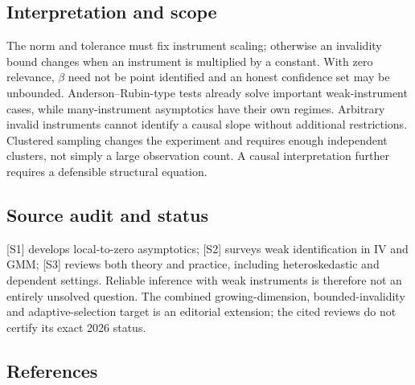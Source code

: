 \documentclass[11pt,a4paper]{article}
\begin{document}
\subsection*{Interpretation and scope}

The norm and tolerance must fix instrument scaling; otherwise an invalidity bound changes when an instrument is multiplied by a constant. With zero relevance, $\beta$ need not be point identified and an honest confidence set may be unbounded. Anderson--Rubin-type tests already solve important weak-instrument cases, while many-instrument asymptotics have their own regimes. Arbitrary invalid instruments cannot identify a causal slope without additional restrictions. Clustered sampling changes the experiment and requires enough independent clusters, not simply a large observation count. A causal interpretation further requires a defensible structural equation.

\subsection*{Source audit and status}

[S1] develops local-to-zero asymptotics; [S2] surveys weak identification in IV and GMM; [S3] reviews both theory and practice, including heteroskedastic and dependent settings. Reliable inference with weak instruments is therefore not an entirely unsolved question. The combined growing-dimension, bounded-invalidity and adaptive-selection target is an editorial extension; the cited reviews do not certify its exact 2026 status.

\subsection*{References}
\end{document}

